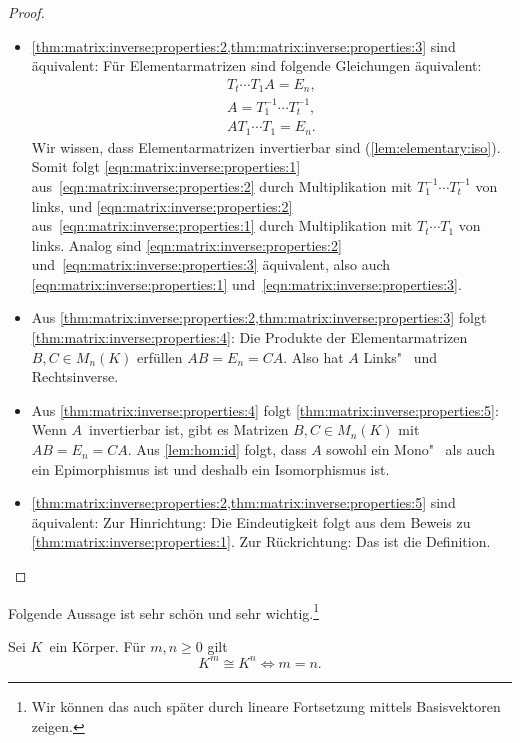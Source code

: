 \documentclass[a4paper]{article}
\begin{document}
\begin{proof}
\begin{itemize}
        \item \cref{thm:matrix:inverse:properties:2,thm:matrix:inverse:properties:3} sind äquivalent: Für Elementarmatrizen sind folgende Gleichungen äquivalent:
              \begin{gather}
                  T_t\cdots T_1A = E_n, \label{eqn:matrix:inverse:properties:1} \\
                  A = T_1^{-1}\cdots T_t^{-1}, \label{eqn:matrix:inverse:properties:2} \\
                  AT_1\cdots T_1 = E_n. \label{eqn:matrix:inverse:properties:3}
              \end{gather}
              Wir wissen, dass Elementarmatrizen invertierbar sind (\cref{lem:elementary:iso}). Somit folgt \cref{eqn:matrix:inverse:properties:1} aus~\cref{eqn:matrix:inverse:properties:2} durch Multiplikation mit $T_1^{-1}\cdots T_t^{-1}$ von links, und \cref{eqn:matrix:inverse:properties:2} aus~\cref{eqn:matrix:inverse:properties:1} durch Multiplikation mit $T_t\cdots T_1$ von links. Analog sind \cref{eqn:matrix:inverse:properties:2} und~\cref{eqn:matrix:inverse:properties:3} äquivalent, also auch \cref{eqn:matrix:inverse:properties:1} und~\cref{eqn:matrix:inverse:properties:3}.
        \item Aus \cref{thm:matrix:inverse:properties:2,thm:matrix:inverse:properties:3} folgt \cref{thm:matrix:inverse:properties:4}: Die Produkte der Elementarmatrizen $B,C \in M_n(K)$ erfüllen $AB = E_n = CA$. Also hat $A$ Links"~ und Rechtsinverse.
        \item Aus \cref{thm:matrix:inverse:properties:4} folgt \cref{thm:matrix:inverse:properties:5}: Wenn $A$~invertierbar ist, gibt es Matrizen $B,C \in M_n(K)$ mit $AB = E_n = CA$. Aus \cref{lem:hom:id} folgt, dass $A$ sowohl ein Mono"~ als auch ein Epimorphismus ist und deshalb ein Isomorphismus ist.
        \item \cref{thm:matrix:inverse:properties:2,thm:matrix:inverse:properties:5} sind äquivalent: Zur Hinrichtung: Die Eindeutigkeit folgt aus dem Beweis zu \cref{thm:matrix:inverse:properties:1}. Zur Rückrichtung: Das ist die Definition.\qedhere
    \end{itemize}
\end{proof}

Folgende Aussage ist sehr schön und sehr wichtig.\footnote{Wir können das auch später durch lineare Fortsetzung mittels Basisvektoren zeigen.}

\begin{corollary}
    Sei $K$~ein Körper. Für $m,n \geq 0$ gilt
    \begin{equation*}
        K^m \cong K^n \iff m = n.
    \end{equation*}
\end{corollary}
\end{document}
